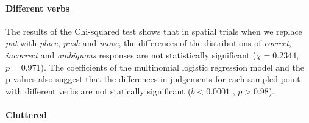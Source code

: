 





\paragraph{Different verbs}
The results of the Chi-squared test shows that in spatial trials when we replace \textit{put} with \textit{place}, \textit{push} and \textit{move}, the differences of the distributions of \textit{correct}, \textit{incorrect} and \textit{ambiguous} responses are not statistically significant ($\chi=0.2344 $, $p = 0.971$). The coefficients of the multinomial logistic regression model and the p-values also suggest that the differences in judgements for each sampled point with different verbs are not statically significant ($b<0.0001$ , $p>0.98$).



\paragraph{Cluttered}

